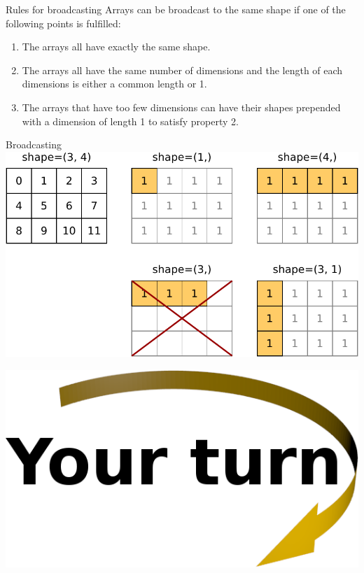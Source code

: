 \documentclass[svgnames]{beamer}
\begin{document}
\begin{frame}{Rules for broadcasting}
 Arrays can be broadcast to the same shape if one of the following points is
 fulfilled:
 \begin{enumerate}
  \item The arrays all have exactly the same shape.
  \item The arrays all have the same number of dimensions and the
        length of each dimensions is either a common length or 1.
  \item The arrays that have too few dimensions can have their
        shapes prepended with a dimension of length 1 to satisfy
        property 2.
 \end{enumerate}
\end{frame}

\begin{frame}{Broadcasting}
 \includegraphics[width=\textwidth]{broadcast}

 \vspace{-0.3truecm}
  \includegraphics[width=3truecm]{yourturn}
\end{frame}
\end{document}
